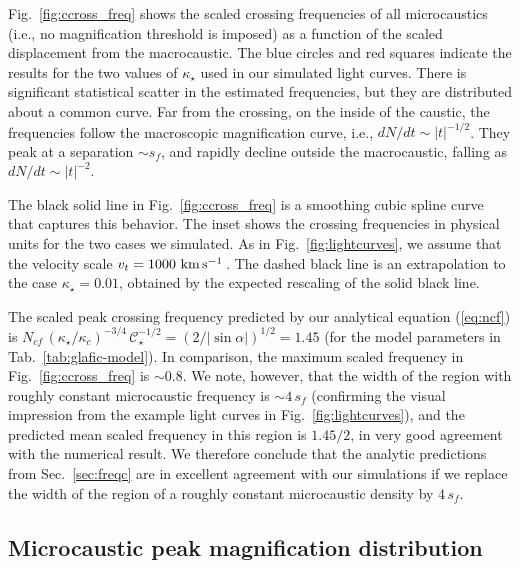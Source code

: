 \documentclass{aastex6}
\newcommand{\reffig}[1]{Fig.~\ref{fig:#1}}
\newcommand{\refsec}[1]{Sec.~\ref{sec:#1}}
\newcommand{\reftab}[1]{Tab.~\ref{tab:#1}}
\def\kms{\, {\rm km}\, {\rm s}^{-1}\, }
\begin{document}
\reffig{ccross_freq} shows the scaled crossing frequencies of all microcaustics (i.e., no magnification threshold is imposed) as a function of the scaled displacement from the macrocaustic. The blue circles and red squares indicate the results for the two values of $\kappa_\star$ used in our simulated light curves. There is significant statistical scatter in the estimated frequencies, but they are distributed about a common curve. Far from the crossing, on the inside of the caustic, the frequencies follow the macroscopic magnification curve, i.e., $dN/dt \sim |t|^{-1/2}$. They peak at a separation $\sim s_f$, and rapidly decline outside the macrocaustic, falling as $dN/dt \sim |t|^{-2}$.

The black solid line in \reffig{ccross_freq} is a smoothing cubic spline curve that captures this behavior. The inset shows the crossing frequencies in physical units for the two cases we simulated. As in \reffig{lightcurves}, we assume that the velocity scale $v_t = 1000 \, \kms$. The dashed black line is an extrapolation to the case $\kappa_\star = 0.01$, obtained by the expected rescaling of the solid black line.

 The scaled peak crossing frequency predicted by our analytical equation (\ref{eq:ncf}) is $N_{cf}\, (\kappa_\star/\kappa_c)^{-3/4}\, \mathcal{C}_\star^{-1/2} = (2/|\sin\alpha |)^{1/2} = 1.45$ (for the model parameters in \reftab{glafic-model}). In comparison, the maximum scaled frequency in \reffig{ccross_freq} is $\sim 0.8$. We note, however, that the width of the region with roughly constant microcaustic frequency is $\sim 4\,s_f$ (confirming the visual impression from the example light curves in \reffig{lightcurves}), and the predicted mean scaled frequency in this region is $1.45/2$, in very good agreement with the numerical result. We therefore conclude that the analytic predictions from \refsec{freqc} are in excellent agreement with our simulations if we replace the width of the region of a roughly constant microcaustic density by $4\,s_f$.

\subsection{Microcaustic peak magnification distribution}
\label{sec:peakmagdist}
\end{document}
